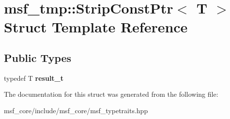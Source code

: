 \hypertarget{structmsf__tmp_1_1StripConstPtr}{\section{msf\-\_\-tmp\-:\-:Strip\-Const\-Ptr$<$ T $>$ Struct Template Reference}
\label{structmsf__tmp_1_1StripConstPtr}
}
\subsection*{Public Types}
\begin{DoxyCompactItemize}
\item 
\hypertarget{structmsf__tmp_1_1StripConstPtr_aaa6063832bdfda3b18f09e719a9f0626}{typedef T {\bfseries result\-\_\-t}}\label{structmsf__tmp_1_1StripConstPtr_aaa6063832bdfda3b18f09e719a9f0626}

\end{DoxyCompactItemize}


The documentation for this struct was generated from the following file\-:\begin{DoxyCompactItemize}
\item 
msf\-\_\-core/include/msf\-\_\-core/msf\-\_\-typetraits.\-hpp\end{DoxyCompactItemize}
